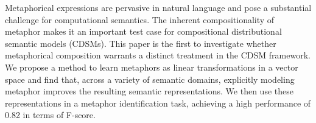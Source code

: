 Metaphorical expressions are pervasive in natural language and pose a substantial challenge for computational semantics.  The inherent compositionality of metaphor makes it an important test case for compositional distributional semantic models (CDSMs). This paper is the first to investigate whether metaphorical composition warrants a distinct treatment in the CDSM framework. We propose a method to learn metaphors as linear transformations in a vector space and find that, across a variety of semantic domains, explicitly modeling metaphor improves the resulting semantic representations. We then use these representations in a metaphor identification task, achieving a high performance of 0.82 in terms of F-score.
